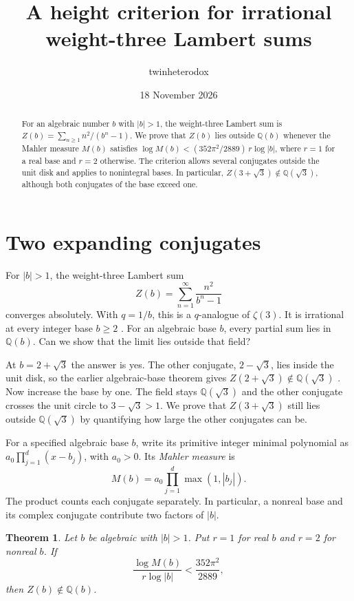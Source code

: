 \documentclass[11pt,letterpaper]{article}
\title{\fontsize{16}{20}\selectfont A height criterion for irrational weight-three Lambert sums}
\author{twinheterodox}
\date{18 November 2026}
\newtheorem{theorem}{Theorem}[section]
\numberwithin{equation}{section}
\newcommand{\Q}{\mathbb Q}
\begin{document}
\maketitle

\begin{abstract}
For an algebraic number \(b\) with \(|b|>1\), the weight-three Lambert
sum is \(Z(b)=\sum_{n\ge1}n^2/(b^n-1)\). We prove that \(Z(b)\)
lies outside \(\Q(b)\) whenever the Mahler measure \(M(b)\) satisfies
\(\log M(b)<(352\pi^2/2889)\,r\log|b|\), where \(r=1\) for a real
base and \(r=2\) otherwise. The criterion allows several conjugates
outside the unit disk and applies to nonintegral bases. In particular,
\(Z(3+\sqrt3)\notin\Q(\sqrt3)\), although both conjugates of the base
exceed one.
\end{abstract}

\section{Two expanding conjugates}

For \(|b|>1\), the weight-three Lambert sum
\[
                         Z(b)=\sum_{n=1}^{\infty}\frac{n^2}{b^n-1}
\]
converges absolutely. With \(q=1/b\), this is a \(q\)-analogue of
\(\zeta(3)\). It is irrational at every integer base \(b\ge2\)
\cite[Theorem~1.1]{Uplift}. For an algebraic base \(b\), every partial
sum lies in \(\Q(b)\). Can we show that the limit lies outside that field?

At \(b=2+\sqrt3\) the answer is yes. The other conjugate,
\(2-\sqrt3\), lies inside the unit disk, so the earlier algebraic-base
theorem gives \(Z(2+\sqrt3)\notin\Q(\sqrt3)\)
\cite[Theorem~1.2]{Previous}. Now increase the base by one. The field
stays \(\Q(\sqrt3)\) and the other conjugate crosses the unit circle to
\(3-\sqrt3>1\). We prove that \(Z(3+\sqrt3)\) still lies outside
\(\Q(\sqrt3)\) by quantifying how large the other conjugates can be.

For a specified algebraic base \(b\), write its primitive integer
minimal polynomial as \(a_0\prod_{j=1}^d(x-b_j)\), with \(a_0>0\).
Its \emph{Mahler measure} is
\[
                     M(b)=a_0\prod_{j=1}^d\max(1,|b_j|).
\]
The product counts each conjugate separately. In particular, a nonreal
base and its complex conjugate contribute two factors of \(|b|\).

\begin{theorem}\label{thm:height}
Let \(b\) be algebraic with \(|b|>1\). Put \(r=1\) for real \(b\) and
\(r=2\) for nonreal \(b\). If
\begin{equation}\label{eq:height}
              \frac{\log M(b)}{r\log|b|}<\frac{352\pi^2}{2889},
\end{equation}
then \(Z(b)\notin\Q(b)\).
\end{theorem}
\end{document}
